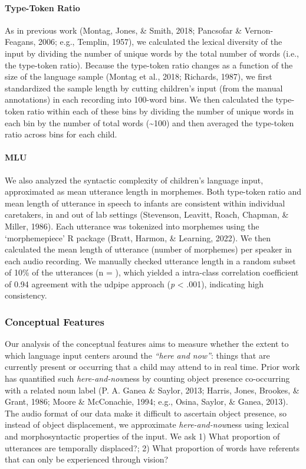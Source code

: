 \documentclass[
  man]{apa6}
\let\oldparagraph\paragraph
\renewcommand{\paragraph}[1]{\oldparagraph{#1}\mbox{}}
\begin{document}
\hypertarget{type-token-ratio}{%
\paragraph{Type-Token Ratio}\label{type-token-ratio}}

As in previous work (Montag, Jones, \& Smith, 2018; Pancsofar \& Vernon-Feagans, 2006; e.g., Templin, 1957), we calculated the lexical diversity of the input by dividing the number of unique words by the total number of words (i.e., the type-token ratio). Because the type-token ratio changes as a function of the size of the language sample (Montag et al., 2018; Richards, 1987), we first standardized the sample length by cutting children's input (from the manual annotations) in each recording into 100-word bins. We then calculated the type-token ratio within each of these bins by dividing the number of unique words in each bin by the number of total words (\textasciitilde100) and then averaged the type-token ratio across bins for each child.

\hypertarget{mlu}{%
\paragraph{MLU}\label{mlu}}

We also analyzed the syntactic complexity of children's language input, approximated as mean utterance length in morphemes. Both type-token ratio and mean length of utterance in speech to infants are consistent within individual caretakers, in and out of lab settings (Stevenson, Leavitt, Roach, Chapman, \& Miller, 1986). Each utterance was tokenized into morphemes using the `morphemepiece' R package (Bratt, Harmon, \& Learning, 2022). We then calculated the mean length of utterance (number of morphemes) per speaker in each audio recording. We manually checked utterance length in a random subset of 10\% of the utterances (n = ), which yielded a intra-class correlation coefficient of 0.94 agreement with the udpipe approach (\emph{p} \textless{} .001), indicating high consistency.

\hypertarget{conceptual-features}{%
\subsubsection{Conceptual Features}\label{conceptual-features}}

Our analysis of the conceptual features aims to measure whether the extent to which language input centers around the \emph{``here and now''}: things that are currently present or occurring that a child may attend to in real time. Prior work has quantified such \emph{here-and-now}ness by counting object presence co-occurring with a related noun label (P. A. Ganea \& Saylor, 2013; Harris, Jones, Brookes, \& Grant, 1986; Moore \& McConachie, 1994; e.g., Osina, Saylor, \& Ganea, 2013). The audio format of our data make it difficult to ascertain object presence, so instead of object displacement, we approximate \emph{here-and-now}ness using lexical and morphosyntactic properties of the input. We ask 1) What proportion of utterances are temporally displaced?; 2) What proportion of words have referents that can only be experienced through vision?
\end{document}
